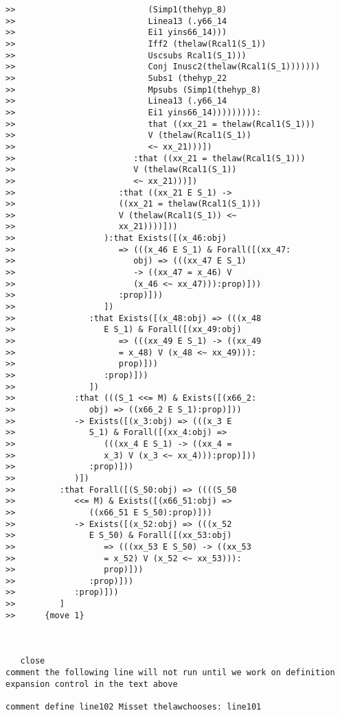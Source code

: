 \documentclass[12pt]{article}
\begin{document}
\begin{verbatim}
>>                           (Simp1(thehyp_8)
>>                           Linea13 (.y66_14
>>                           Ei1 yins66_14)))
>>                           Iff2 (thelaw(Rcal1(S_1))
>>                           Uscsubs Rcal1(S_1)))
>>                           Conj Inusc2(thelaw(Rcal1(S_1)))))))
>>                           Subs1 (thehyp_22
>>                           Mpsubs (Simp1(thehyp_8)
>>                           Linea13 (.y66_14
>>                           Ei1 yins66_14))))))))):
>>                           that ((xx_21 = thelaw(Rcal1(S_1)))
>>                           V (thelaw(Rcal1(S_1))
>>                           <~ xx_21)))])
>>                        :that ((xx_21 = thelaw(Rcal1(S_1)))
>>                        V (thelaw(Rcal1(S_1))
>>                        <~ xx_21)))])
>>                     :that ((xx_21 E S_1) ->
>>                     ((xx_21 = thelaw(Rcal1(S_1)))
>>                     V (thelaw(Rcal1(S_1)) <~
>>                     xx_21))))]))
>>                  ):that Exists([(x_46:obj)
>>                     => (((x_46 E S_1) & Forall([(xx_47:
>>                        obj) => (((xx_47 E S_1)
>>                        -> ((xx_47 = x_46) V
>>                        (x_46 <~ xx_47))):prop)]))
>>                     :prop)]))
>>                  ])
>>               :that Exists([(x_48:obj) => (((x_48
>>                  E S_1) & Forall([(xx_49:obj)
>>                     => (((xx_49 E S_1) -> ((xx_49
>>                     = x_48) V (x_48 <~ xx_49))):
>>                     prop)]))
>>                  :prop)]))
>>               ])
>>            :that (((S_1 <<= M) & Exists([(x66_2:
>>               obj) => ((x66_2 E S_1):prop)]))
>>            -> Exists([(x_3:obj) => (((x_3 E
>>               S_1) & Forall([(xx_4:obj) =>
>>                  (((xx_4 E S_1) -> ((xx_4 =
>>                  x_3) V (x_3 <~ xx_4))):prop)]))
>>               :prop)]))
>>            )])
>>         :that Forall([(S_50:obj) => ((((S_50
>>            <<= M) & Exists([(x66_51:obj) =>
>>               ((x66_51 E S_50):prop)]))
>>            -> Exists([(x_52:obj) => (((x_52
>>               E S_50) & Forall([(xx_53:obj)
>>                  => (((xx_53 E S_50) -> ((xx_53
>>                  = x_52) V (x_52 <~ xx_53))):
>>                  prop)]))
>>               :prop)]))
>>            :prop)]))
>>         ]
>>      {move 1}



   close
comment the following line will not run until we work on definition expansion control in the text above

comment define line102 Misset thelawchooses: line101

\end{verbatim}
\end{document}
